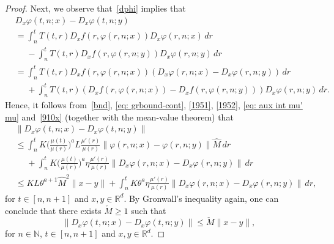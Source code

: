 \documentclass[reqno, a4paper, 10pt]{amsart}
\theoremstyle{plain}
\numberwithin{equation}{section}
\theoremstyle{remark}
\renewcommand{\phi}{\varphi}
\def\N{\mathbb{N}}
\def\R{\mathbb{R}}
\begin{document}
\begin{proof}
Next, we observe that~\eqref{dphi} implies that 
\[
\begin{split}
&D_x\phi(t, n;x)-D_x\phi(t, n; y)
\\
&=\int_n^t T(t,r)D_xf(r, \phi(r, n;x))D_x\phi(r, n;x)\, dr \\
&\phantom{=}-\int_n^t T(t,r)D_xf(r, \phi(r, n;y))D_x\phi(r, n;y)\, dr \\
&=\int_n^t T(t,r)D_xf(r, \phi(r, n;x))(D_x\phi(r, n;x)-D_x\phi(r, n;y))\, dr \\
&\phantom{=}+\int_n^t T(t,r)(D_xf(r, \phi(r, n;x))-D_xf(r, \phi(r, n;y)))D_x\phi(r, n;y)\, dr.
\end{split}
\]
Hence, it follows from~\eqref{bnd}, \eqref{eq: grbound-cont}, \eqref{1951}, \eqref{1952}, \eqref{eq: aux int mu' mu} and~\eqref{910x} (together with the
mean-value theorem) that
\[
\begin{split}
&\lVert D_x\phi(t, n;x)-D_x\phi(t, n; y)  \rVert
\\
&\leq \int_n^t K \bigg (\frac{\mu(t)}{\mu(r)}\bigg )^a L\frac{\mu'(r)}{\mu(r)} \lVert \phi(r, n;x)-\phi(r, n;y)\rVert \hat M \, dr\\
&\phantom{=}+\int_n^t K \bigg (\frac{\mu(t)}{\mu(r)}\bigg )^a \eta \frac{\mu'(r)}{\mu(r)} \lVert D_x\phi(r, n;x)-D_x\phi(r, n;y)\rVert \, dr\\
&\le KL \theta^{a+1}\hat M^2\|x-y\|+ \int_n^t K\theta^a \eta \frac{\mu'(r)}{\mu(r)} \lVert D_x\phi(r, n;x)-D_x\phi(r, n;y)\rVert \, dr,
\end{split}
\]
for $t\in [n, n+1]$ and $x, y\in \R^d$.   By Gronwall's inequality again, one can conclude that there exists $\check M\geq 1$ such that
\begin{equation}\label{Df-Df}
\lVert D_x\phi(t, n;x)-D_x\phi(t, n; y)  \rVert  \le  \check M\lVert x-y\rVert,
\end{equation}
for $n\in \N$, $t\in [n, n+1]$ and $x, y\in \R^d$.


\end{proof}
\end{document}
